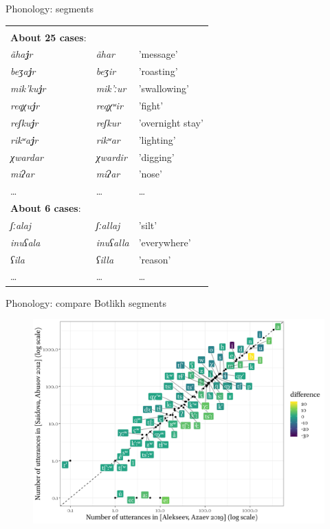 \begin{frame}{Phonology: segments}
\begin{tabular}{lll}
\citet{alekseev2019} &\citet{saidovaabusov2012} & \\
\textbf{About 25 cases}: & & \\
\textit{ãha\textbf{\underline{j}}r}   & \textit{ãhar}   & 'message’        \\
\textit{beʒa\textbf{\underline{j}}r}   & \textit{beʒir}   & 'roasting’       \\
\textit{mik'ku\textbf{\underline{j}}r} & \textit{mik'ːur} & 'swallowing’     \\
\textit{reqχu\textbf{\underline{j}}r}  & \textit{reqχʷir} & 'fight’          \\
\textit{reʃku\textbf{\underline{j}}r}  & \textit{reʃkur}  & 'overnight stay’ \\
\textit{rikʷa\textbf{\underline{j}}r}  & \textit{rikʷar} & 'lighting’     \\ \hline
\textit{χwardar} & \textit{χwardir} & 'digging' \\
\textit{miʔar} & \textit{miʔar} & 'nose'\\ 
\dots & \dots & \dots \\ 
\textbf{About 6 cases}: & & \\
\textit{ʃːalaj} & \textit{ʃːallaj} & 'silt' \\
\textit{inuʕala} & \textit{inuʕalla} & 'everywhere' \\
\textit{ʕila} & \textit{ʕilla} & 'reason' \\
\dots & \dots & \dots \\
\end{tabular}
\end{frame}

\begin{frame}{Phonology: compare Botlikh segments}
\begin{figure}[h]
\centering
\includegraphics[width = \linewidth]{images/04_compare_botlikh_dicts_with_stress.png}
\end{figure}
\end{frame}

